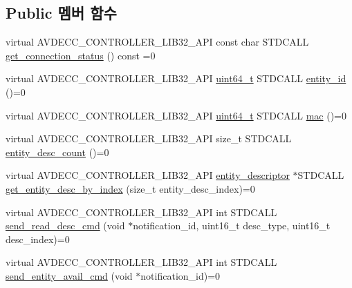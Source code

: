 \subsection*{Public 멤버 함수}
\begin{DoxyCompactItemize}
\item 
virtual A\+V\+D\+E\+C\+C\+\_\+\+C\+O\+N\+T\+R\+O\+L\+L\+E\+R\+\_\+\+L\+I\+B32\+\_\+\+A\+PI const char S\+T\+D\+C\+A\+LL \hyperlink{classavdecc__lib_1_1end__station_a0be4236753cbfd6dc2f23c9f96ca61bc}{get\+\_\+connection\+\_\+status} () const =0
\item 
virtual A\+V\+D\+E\+C\+C\+\_\+\+C\+O\+N\+T\+R\+O\+L\+L\+E\+R\+\_\+\+L\+I\+B32\+\_\+\+A\+PI \hyperlink{parse_8c_aec6fcb673ff035718c238c8c9d544c47}{uint64\+\_\+t} S\+T\+D\+C\+A\+LL \hyperlink{classavdecc__lib_1_1end__station_a3374e7e9d63f8e1756480b16df9bc0c0}{entity\+\_\+id} ()=0
\item 
virtual A\+V\+D\+E\+C\+C\+\_\+\+C\+O\+N\+T\+R\+O\+L\+L\+E\+R\+\_\+\+L\+I\+B32\+\_\+\+A\+PI \hyperlink{parse_8c_aec6fcb673ff035718c238c8c9d544c47}{uint64\+\_\+t} S\+T\+D\+C\+A\+LL \hyperlink{classavdecc__lib_1_1end__station_a74d2328723e6f5ab7a275e3b0d4cf2a0}{mac} ()=0
\item 
virtual A\+V\+D\+E\+C\+C\+\_\+\+C\+O\+N\+T\+R\+O\+L\+L\+E\+R\+\_\+\+L\+I\+B32\+\_\+\+A\+PI size\+\_\+t S\+T\+D\+C\+A\+LL \hyperlink{classavdecc__lib_1_1end__station_a14c0322d46a8800dbb4908716db50d86}{entity\+\_\+desc\+\_\+count} ()=0
\item 
virtual A\+V\+D\+E\+C\+C\+\_\+\+C\+O\+N\+T\+R\+O\+L\+L\+E\+R\+\_\+\+L\+I\+B32\+\_\+\+A\+PI \hyperlink{classavdecc__lib_1_1entity__descriptor}{entity\+\_\+descriptor} $\ast$S\+T\+D\+C\+A\+LL \hyperlink{classavdecc__lib_1_1end__station_a7456434346294f611e4d37255be4051b}{get\+\_\+entity\+\_\+desc\+\_\+by\+\_\+index} (size\+\_\+t entity\+\_\+desc\+\_\+index)=0
\item 
virtual A\+V\+D\+E\+C\+C\+\_\+\+C\+O\+N\+T\+R\+O\+L\+L\+E\+R\+\_\+\+L\+I\+B32\+\_\+\+A\+PI int S\+T\+D\+C\+A\+LL \hyperlink{classavdecc__lib_1_1end__station_a28ef0a87c0f86fde09e184afba1dbc56}{send\+\_\+read\+\_\+desc\+\_\+cmd} (void $\ast$notification\+\_\+id, uint16\+\_\+t desc\+\_\+type, uint16\+\_\+t desc\+\_\+index)=0
\item 
virtual A\+V\+D\+E\+C\+C\+\_\+\+C\+O\+N\+T\+R\+O\+L\+L\+E\+R\+\_\+\+L\+I\+B32\+\_\+\+A\+PI int S\+T\+D\+C\+A\+LL \hyperlink{classavdecc__lib_1_1end__station_a61f474caee9197db7d0913f5ff49dd92}{send\+\_\+entity\+\_\+avail\+\_\+cmd} (void $\ast$notification\+\_\+id)=0
\item 

\end{DoxyCompactItemize}
